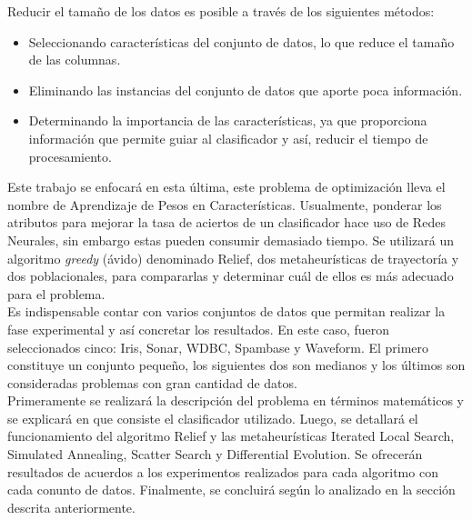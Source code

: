 \documentclass{ci5652}
\begin{document}
Reducir el tamaño de los datos es posible a través de los siguientes métodos:

\begin{itemize}
  \item Seleccionando características del conjunto de datos, lo que reduce el
  tamaño de las columnas.
  \item Eliminando las instancias del conjunto de datos que aporte poca
  información.
  \item Determinando la importancia de las características, ya que proporciona
  información que permite guiar al clasificador y así, reducir el tiempo de
  procesamiento.\cite{Cano_2003}
\end{itemize}

Este trabajo se enfocará en esta última, este problema de optimización  lleva el
nombre de Aprendizaje de Pesos en Características. Usualmente, ponderar los
atributos para mejorar la tasa de aciertos de un clasificador hace uso de Redes
Neurales, sin embargo estas pueden consumir demasiado tiempo. Se utilizará un
algoritmo \textit{greedy} (ávido) denominado Relief, dos metaheurísticas de
trayectoría y dos poblacionales, para compararlas y determinar cuál de ellos es
más adecuado para el problema.\\

Es indispensable contar con varios conjuntos de datos que permitan realizar la
fase experimental y así concretar los resultados. En este caso, fueron
seleccionados cinco: Iris, Sonar, WDBC, Spambase y Waveform. El primero
constituye un conjunto pequeño, los siguientes dos son medianos y los últimos
son consideradas problemas con gran cantidad de datos.\\

Primeramente se realizará la descripción del problema en términos matemáticos y
se explicará en que consiste el clasificador utilizado. Luego, se detallará el
funcionamiento del algoritmo Relief y las metaheurísticas Iterated Local Search,
Simulated Annealing, Scatter Search y Differential Evolution. Se ofrecerán
resultados de acuerdos a los experimentos realizados para cada algoritmo con
cada conunto de datos. Finalmente, se concluirá según lo analizado en la sección
descrita anteriormente.

\end{document}

